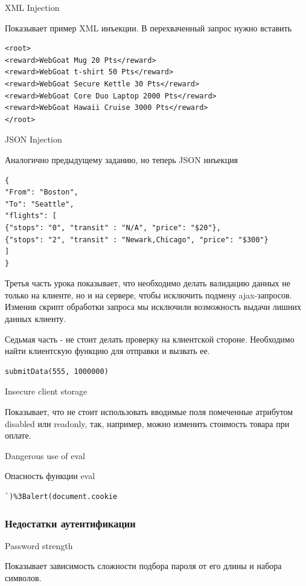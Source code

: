 \documentclass[10pt,a4paper]{article}
\begin{document}
XML Injection

Показывает пример XML инъекции. В перехваченный запрос нужно вставить
\begin{verbatim}
<root>
<reward>WebGoat Mug 20 Pts</reward>
<reward>WebGoat t-shirt 50 Pts</reward>
<reward>WebGoat Secure Kettle 30 Pts</reward>
<reward>WebGoat Core Duo Laptop 2000 Pts</reward>
<reward>WebGoat Hawaii Cruise 3000 Pts</reward>
</root>
\end{verbatim}

JSON Injection

Аналогично предыдущему заданию, но теперь JSON инъекция
\begin{verbatim}
{
"From": "Boston",
"To": "Seattle",
"flights": [
{"stops": "0", "transit" : "N/A", "price": "$20"},
{"stops": "2", "transit" : "Newark,Chicago", "price": "$300"}
]
}
\end{verbatim}




Третья часть урока показывает, что необходимо делать валидацию данных не только на клиенте, но и на сервере, чтобы исключить подмену ajax-запросов. Изменив скрипт обработки запроса мы исключили возможность выдачи лишних данных клиенту.




Седьмая часть - не стоит делать проверку на клиентской стороне. Необходимо найти клиентскую функцию для отправки и вызвать ее.
\begin{verbatim}
submitData(555, 1000000)
\end{verbatim}

Insecure client storage

Показывает, что не стоит использовать вводимые поля помеченные атрибутом disabled или readonly, так, например, можно изменить стоимость товара при оплате.


Dangerous use of eval

Опасность функции eval

\begin{verbatim}
`)%3Balert(document.cookie
\end{verbatim}

\subsubsection{Недостатки аутентификации}

Password strength

Показывает зависимость сложности подбора пароля от его длины и набора символов.
\end{document}
